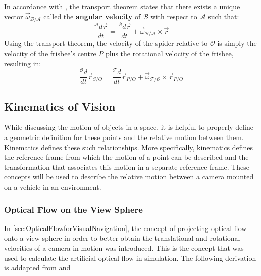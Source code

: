 \documentclass{UoNMCHA}
\numberwithin{equation}{section}
\begin{document}
In accordance with \cite{3900Notes}, the transport theorem states that there exists a unique vector $\vec{\omega}_{\mathcal{B}/\mathcal{A}}$ called the \textbf{angular velocity} of $\mathbf{\mathcal{B}}$ with respect to $\mathbf{\mathcal{A}}$ such that:
\begin{equation}\label{eq:transportTheorem}
	\frac{{}^\mathcal{A}d\vec{r}}{dt} = \frac{{}^\mathcal{B}d\vec{r}}{dt} + \vec{\omega}_{\mathcal{B}/\mathcal{A}}\times\vec{r}
\end{equation}
Using the transport theorem, the velocity of the spider relative to $\mathcal{O}$ is simply the velocity of the frisbee's centre $P$ plus the rotational velocity of the frisbee, resulting in:
\begin{equation}
	\frac{{}^\mathcal{O}d}{dt}\vec{r}_{S/O} = \frac{{}^\mathcal{F}d}{dt}\vec{r}_{P/O} + \vec{\omega}_{\mathcal{F}/\mathcal{O}}\times\vec{r}_{P/O}
\end{equation}

\subsection{Kinematics of Vision}
While discussing the motion of objects in a space, it is helpful to properly define a geometric definition for these points and the relative motion between them. Kinematics defines these such relationships. More specifically, kinematics defines the reference frame from which the motion of a point can be described and the transformation that associates this motion in a separate reference frame. These concepts will be used to describe the relative motion between a camera mounted on a vehicle in an environment.

\subsubsection{Optical Flow on the View Sphere}\label{sec:SphericalFlow}

In \cref{sec:OpticalFlowforVisualNavigation}, the concept of projecting optical flow onto a view sphere in order to better obtain the translational and rotational velocities of a camera in motion was introduced. This is the concept that was used to calculate the artificial optical flow in simulation. The following derivation is addapted from \cite{TimsFYP} and \cite{opticFlowLecture}
\end{document}
